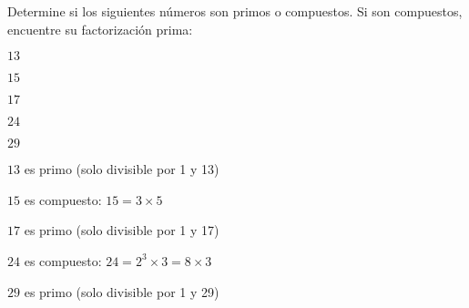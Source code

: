 \begin{exercise}
\problem Determine si los siguientes números son primos o compuestos. Si son compuestos, encuentre su factorización prima:

\begin{exerciselist}
    \item $13$ \hspace{3cm} \underline{\hspace{3cm}}
    \item $15$ \hspace{3cm} \underline{\hspace{3cm}}
    \item $17$ \hspace{3cm} \underline{\hspace{3cm}}
    \item $24$ \hspace{3cm} \underline{\hspace{3cm}}
    \item $29$ \hspace{3cm} \underline{\hspace{3cm}}
\end{exerciselist}

\begin{solucion}
\begin{exerciselist}
    \item $13$ es primo (solo divisible por 1 y 13)
    \item $15$ es compuesto: $15 = 3 \times 5$
    \item $17$ es primo (solo divisible por 1 y 17)
    \item $24$ es compuesto: $24 = 2^3 \times 3 = 8 \times 3$
    \item $29$ es primo (solo divisible por 1 y 29)
\end{exerciselist}
\end{solucion}
\end{exercise}

